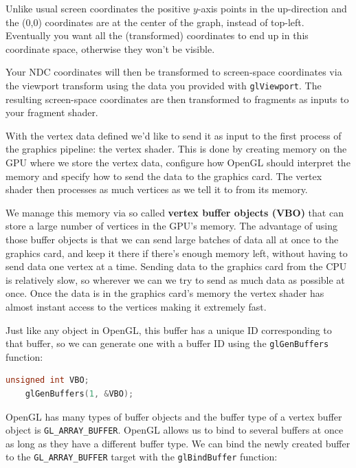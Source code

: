 \begin{note}
    Unlike usual screen coordinates the positive $y$-axis points in the up-direction and the (0,0) coordinates are at the center of the graph, instead of top-left. Eventually you want all the (transformed) coordinates to end up in this coordinate space, otherwise they won't be visible.

    Your NDC coordinates will then be transformed to screen-space coordinates via the viewport transform using the data you provided with \verb|glViewport|. The resulting screen-space coordinates are then transformed to fragments as inputs to your fragment shader.
\end{note}

With the vertex data defined we'd like to send it as input to the first process of the graphics pipeline: the vertex shader. This is done by creating memory on the GPU where we store the vertex data, configure how OpenGL should interpret the memory and specify how to send the data to the graphics card. The vertex shader then processes as much vertices as we tell it to from its memory.

We manage this memory via so called \textbf{vertex buffer objects (VBO)} that can store a large number of vertices in the GPU's memory. The advantage of using those buffer objects is that we can send large batches of data all at once to the graphics card, and keep it there if there's enough memory left, without having to send data one vertex at a time. Sending data to the graphics card from the CPU is relatively slow, so wherever we can we try to send as much data as possible at once. Once the data is in the graphics card's memory the vertex shader has almost instant access to the vertices making it extremely fast.

Just like any object in OpenGL, this buffer has a unique ID corresponding to that buffer, so we can generate one with a buffer ID using the \verb|glGenBuffers| function:

\newpage

\begin{lstlisting}[language=C++]
    unsigned int VBO;
    glGenBuffers(1, &VBO);
\end{lstlisting}

OpenGL has many types of buffer objects and the buffer type of a vertex buffer object is \verb|GL_ARRAY_BUFFER|. OpenGL allows us to bind to several buffers at once as long as they have a different buffer type. We can bind the newly created buffer to the \verb|GL_ARRAY_BUFFER| target with the \verb|glBindBuffer| function:

